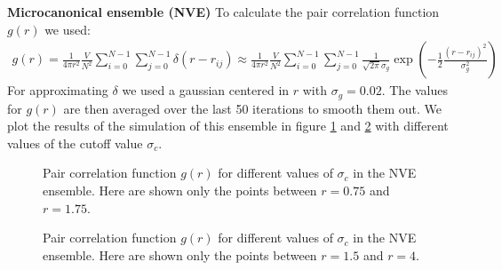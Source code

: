 \documentclass[../main.tex]{subfiles}
\begin{document}
\noindent\textbf{Microcanonical ensemble (NVE)} To calculate the pair correlation function $g(r)$ we used:
\begin{align}
    g(r) =  \frac{1}{4\pi r^2} \frac{V}{N^2}\sum_{i=0}^{N-1} \sum_{j=0}^{N-1} \delta(r-r_{ij}) \approx \frac{1}{4\pi r^2} \frac{V}{N^2}\sum_{i=0}^{N-1} \sum_{j=0}^{N-1} \frac{1}{\sqrt{2\pi}\sigma_g} \exp\left(-\frac{1}{2}\frac{(r-r_{ij})^2}{\sigma_g^2}\right)
\end{align}For approximating $\delta$ we used a gaussian centered in $r$ with $\sigma_g=0.02$. The values for $g(r)$ are then averaged over the last 50 iterations to smooth them out. We plot the results of the simulation of this ensemble in figure \ref{fig: ex_10_nve_gleft} and \ref{fig: ex_10_nve_gright} with different values of the cutoff value $\sigma_c$.

\begin{figure}[H]
    \centering
    \begin{subfigure}{.99\textwidth}
        \centering
        
    \end{subfigure}
    \caption{Pair correlation function $g(r)$ for different values of $\sigma_c$ in the NVE ensemble. Here are shown only the points between $r=0.75$ and $r=1.75$.}
    \label{fig: ex_10_nve_gleft}
\end{figure}

\begin{figure}[H]
    \centering
    \begin{subfigure}{.99\textwidth}
        \centering
        
    \end{subfigure}
    \caption{Pair correlation function $g(r)$ for different values of $\sigma_c$ in the NVE ensemble. Here are shown only the points between $r=1.5$ and $r=4$.}
    \label{fig: ex_10_nve_gright}
\end{figure}
\end{document}
